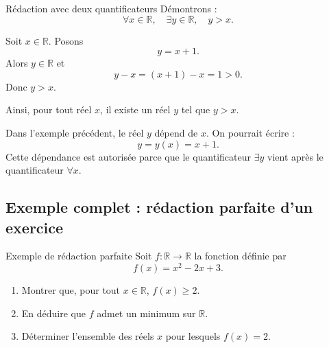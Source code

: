 \documentclass[11pt,a4paper]{article}
\begin{document}
\begin{exemplebox}{Rédaction avec deux quantificateurs}{}
Démontrons :
\[
\forall x\in\mathbb{R},\quad \exists y\in\mathbb{R},\quad y>x.
\]

Soit $x\in\mathbb{R}$. Posons
\[
y=x+1.
\]
Alors $y\in\mathbb{R}$ et
\[
y-x=(x+1)-x=1>0.
\]
Donc $y>x$.

Ainsi, pour tout réel $x$, il existe un réel $y$ tel que $y>x$.
\end{exemplebox}

\begin{retenirbox}
Dans l'exemple précédent, le réel $y$ dépend de $x$. On pourrait écrire :
\[
y=y(x)=x+1.
\]
Cette dépendance est autorisée parce que le quantificateur $\exists y$ vient après le quantificateur $\forall x$.
\end{retenirbox}

\subsection{Exemple complet : rédaction parfaite d'un exercice}

\begin{exercicebox}{Exemple de rédaction parfaite}{}
Soit $f:\mathbb{R}\to\mathbb{R}$ la fonction définie par
\[
f(x)=x^2-2x+3.
\]
\begin{enumerate}
    \item Montrer que, pour tout $x\in\mathbb{R}$, $f(x)\geq 2$.
    \item En déduire que $f$ admet un minimum sur $\mathbb{R}$.
    \item Déterminer l'ensemble des réels $x$ pour lesquels $f(x)=2$.
\end{enumerate}
\end{exercicebox}
\end{document}
